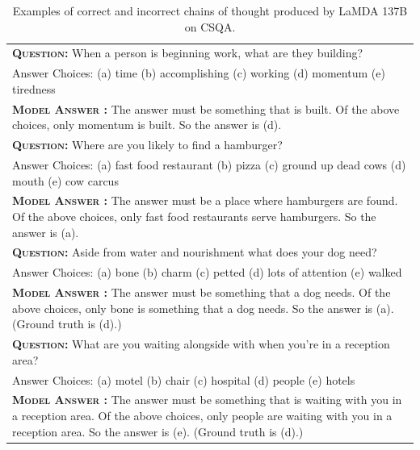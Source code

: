 \documentclass[]{article}
\newcommand{\xmark}{\ding{55}}%
\theoremstyle{plain}
\theoremstyle{definition}
\theoremstyle{remark}
\newcommand{\lamda}[0]{LaMDA}
\begin{document}
\begin{table}[H]
    \caption{
    Examples of correct and incorrect chains of thought produced by \lamda{} 137B on CSQA.
    }
    \centering
    \small
    \begin{tabular}{p{\linewidth}}
        \toprule
        \vspace{-2mm}
        \textbf{\textsc{Question:}} When a person is beginning work, what are they building? \\
        Answer Choices: (a) time (b) accomplishing (c) working (d) momentum (e) tiredness \\
        \vspace{-1mm}
        \textbf{\textsc{Model Answer \color{darkGreen}{(CORRECT)}:}} The answer must be something that is built. Of the above choices, only momentum is built. So the answer is (d). \color{darkGreen}{\checkmark} \\
        \midrule
        \vspace{-2mm}
        \textbf{\textsc{Question:}} Where are you likely to find a hamburger? \\
        Answer Choices: (a) fast food restaurant (b) pizza (c) ground up dead cows (d) mouth (e) cow carcus\\
        \vspace{-1mm}
        \textbf{\textsc{Model Answer \color{darkGreen}{(CORRECT)}:}} The answer must be a place where hamburgers are found. Of the above choices, only fast food restaurants serve hamburgers. So the answer is (a). \color{darkGreen}{\checkmark} \\
        \midrule
        \vspace{-2mm}
        \textbf{\textsc{Question:}} Aside from water and nourishment what does your dog need? \\
        Answer Choices: (a) bone (b) charm (c) petted (d) lots of attention (e) walked \\
        \vspace{-1mm}
        \textbf{\textsc{Model Answer \color{blue}{(INCORRECT)}:}} The answer must be something that a dog needs. Of the above choices, {\color{blue} only bone is something that a dog needs.} So the answer is (a). {\color{blue} \xmark{} (Ground truth is (d).)} \\
        \midrule
        \vspace{-2mm}
        \textbf{\textsc{Question:}} What are you waiting alongside with when you're in a reception area? \\
        Answer Choices: (a) motel (b) chair (c) hospital (d) people (e) hotels \\
        \vspace{-1mm}
        \textbf{\textsc{Model Answer \color{blue}{(INCORRECT)}:}} The answer must be something that is waiting with you in a reception area. Of the above choices, only people are waiting with you in a reception area. So the {\color{blue} answer is (e)}. {\color{blue} \xmark{} (Ground truth is (d).)} \\
        \bottomrule
    \end{tabular}
    \label{tab:appendix-commonsenseqa-examples}
\end{table}
\end{document}
